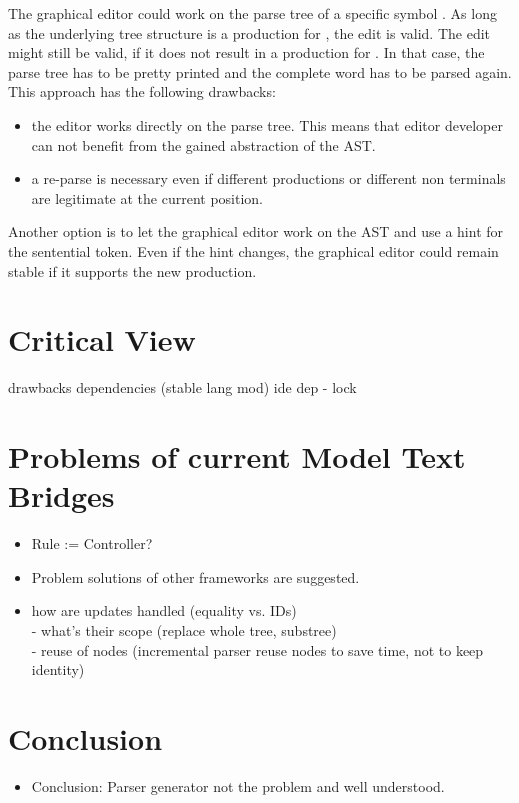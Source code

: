 The graphical editor could work on the parse tree of a specific symbol .  As long as the underlying tree structure is a production for , the edit is valid. The edit might still be valid, if it does not result in a production for . In that case, the parse tree has to be pretty printed and the complete word has to be parsed again. This approach has the following drawbacks:
\begin{itemize}
	\item the editor works directly on the parse tree. This means that editor developer can not benefit from the gained abstraction of the AST.
	\item a re-parse is necessary even if different productions or different non terminals are legitimate at the current position. 
\end{itemize}

Another option is to let the graphical editor work on the AST and use a hint for the sentential token. Even if the hint changes, the graphical editor could remain stable if it supports the new production. 



\section{Critical View}
drawbacks 
dependencies (stable lang mod)
ide dep - lock

\section{Problems of current Model Text Bridges}
\begin{itemize}
	\item Rule := Controller?
	\item Problem solutions of other frameworks are suggested.
\item how are updates handled (equality vs. IDs) \\
		- what's their scope (replace whole tree, substree) \\
		-	reuse of nodes (incremental parser reuse nodes to save time, not to keep identity)
\end{itemize}	


\section{Conclusion}
\begin{itemize}
	\item Conclusion: Parser generator not the problem and well understood.
\end{itemize}	
